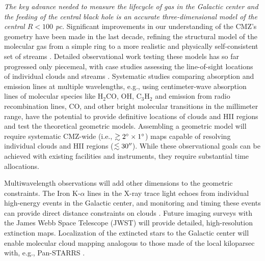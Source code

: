 \documentclass[modern]{aastex62}
\begin{document}
\textit{The key advance needed to measure the lifecycle of gas in the Galactic
center and the feeding of the central black hole is an accurate
three-dimensional model of the central $R<100$ pc.} Significant improvements in
our understanding
of the CMZ's geometry have been made in the last decade, refining the structural
model of the molecular gas from a simple ring to a more realistic and physically
self-consistent set of streams
\citep{Molinari2011a,Kruijssen2015a,Ridley2017a,Sormani2018a,Kruijssen2019b}.
Detailed observational work testing these models has so far progressed only
piecemeal, with case studies assessing the line-of-sight locations of
individual clouds and streams \citep[e.g.,][]{Henshaw2016a,Butterfield2018a}.
Systematic studies
comparing absorption and emission lines at multiple wavelengths, e.g., using
centimeter-wave absorption lines of molecular species like H$_2$CO, OH,
C$_3$H$_2$ and emission from radio recombination lines, CO, and other bright
molecular transitions in the millimeter range, have the potential to provide
definitive locations of clouds and HII regions and test the theoretical
geometric models.  Assembling a geometric model will require systematic
CMZ-wide (i.e., $\gtrsim2^{\circ}\times1^{\circ}$) maps capable of resolving
individual clouds and HII regions ($\lesssim30\mbox{$^{\prime\prime}$}$).  While these
observational goals can be achieved with existing facilities and instruments,
they require substantial time allocations.

Multiwavelength observations will add other dimensions to the geometric constraints.
The Iron K-$\alpha$ lines in the X-ray trace light echoes from individual
high-energy events in the Galactic center, and monitoring and timing these
events can provide direct distance constraints on clouds
\citep[e.g.][]{Clavel2014a,Churazov2017b,Churazov2017a,Terrier2018a}. Future
imaging surveys with the James Webb Space Telescope (JWST) will provide
detailed, high-resolution extinction maps. Localization of the extincted stars 
to the Galactic center will enable molecular cloud mapping analogous to those
made of the local kiloparsec with, e.g., Pan-STARRS \citep{Green2015b}.

\end{document}
